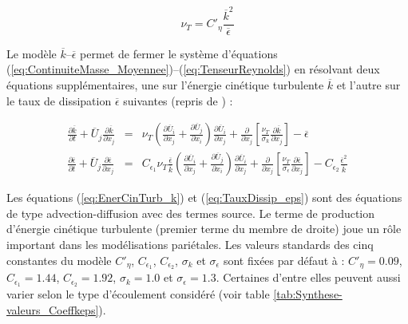 \begin{equation}
\nu_{T}=C'_{\eta}\frac{\overline{k}^{2}}{\overline{\epsilon}}\label{eq:nu_T_RANS}
\end{equation}


Le mod\`ele $\overline{k}$--$\overline{\epsilon}$ permet de fermer
le syst\`eme d'\'equations (\ref{eq:ContinuiteMasse_Moyennee})--(\ref{eq:TenseurReynolds})
en r\'esolvant deux \'equations suppl\'ementaires, une sur l'\'energie cin\'etique
turbulente $\overline{k}$ et l'autre sur le taux de dissipation $\overline{\epsilon}$
suivantes \cite[p. 469]{Book_Chassaing} (repris de \cite[Eq. (2.2-1 et 2.2-2)]{Launder-Spalding_NumCompTurbFlow1974})
:

\begin{subequations}

\begin{eqnarray}
\frac{\partial\overline{k}}{\partial t}+\overline{U}_{j}\frac{\partial\overline{k}}{\partial x_{j}} & = & \nu_{T}\left(\frac{\partial\overline{U}_{i}}{\partial x_{j}}+\frac{\partial\overline{U}_{j}}{\partial x_{i}}\right)\frac{\partial\overline{U}_{i}}{\partial x_{j}}+\frac{\partial}{\partial x_{j}}\left[\frac{\nu_{T}}{\sigma_{k}}\frac{\partial\overline{k}}{\partial x_{j}}\right]-\overline{\epsilon}\label{eq:EnerCinTurb_k}\\
\frac{\partial\overline{\epsilon}}{\partial t}+\overline{U}_{j}\frac{\partial\overline{\epsilon}}{\partial x_{j}} & = & C_{\epsilon_{1}}\nu_{T}\frac{\overline{\epsilon}}{\overline{k}}\left(\frac{\partial\overline{U}_{i}}{\partial x_{j}}+\frac{\partial\overline{U}_{j}}{\partial x_{i}}\right)\frac{\partial\overline{U}_{i}}{\partial x_{j}}+\frac{\partial}{\partial x_{j}}\left[\frac{\nu_{T}}{\sigma_{\epsilon}}\frac{\partial\overline{\epsilon}}{\partial x_{j}}\right]-C_{\epsilon_{2}}\frac{\overline{\epsilon}^{2}}{\overline{k}}\label{eq:TauxDissip_eps}
\end{eqnarray}


\end{subequations}

Les \'equations (\ref{eq:EnerCinTurb_k}) et (\ref{eq:TauxDissip_eps})
sont des \'equations de type advection-diffusion avec des termes source.
Le terme de production d\textquoteright \'energie cin\'etique turbulente
(premier terme du membre de droite) joue un r\^ole important dans les
mod\'elisations pari\'etales. Les valeurs standards des cinq constantes
du mod\`ele $C'_{\eta}$, $C_{\epsilon_{1}}$, $C_{\epsilon_{2}}$,
$\sigma_{k}$ et $\sigma_{\epsilon}$ sont fix\'ees par d\'efaut \`a : $C'_{\eta}=0.09$,
$C_{\epsilon_{1}}=1.44$, $C_{\epsilon_{2}}=1.92$, $\sigma_{k}=1.0$
et $\sigma_{\epsilon}=1.3$. Certaines d'entre elles peuvent aussi
varier selon le type d'\'ecoulement consid\'er\'e (voir table \ref{tab:Synthese-valeurs_Coeffkeps}).


